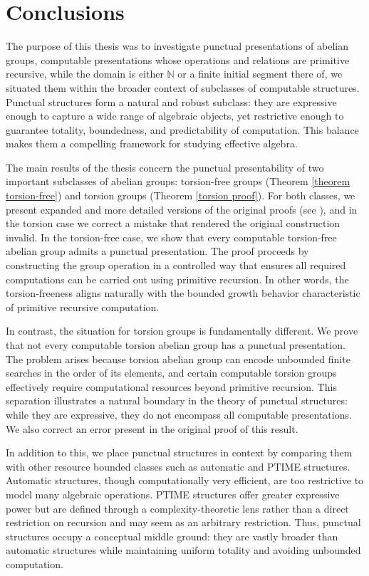 \documentclass{pracalicmgr2025}
\theoremstyle{plain}            %
\theoremstyle{remark}           %
\theoremstyle{definition}       %
\begin{document}
\chapter{Conclusions}
The purpose of this thesis was to investigate punctual presentations of abelian groups, computable presentations whose operations and relations are primitive recursive, while the domain is either $\mathbb{N}$ or a finite initial segment there of, we situated them within the broader context of subclasses of computable structures. Punctual structures form a natural and robust subclass: they are expressive enough to capture a wide range of algebraic objects, yet restrictive enough to guarantee totality, boundedness, and predictability of computation. This balance makes them a compelling framework for studying effective algebra.


The main results of the thesis concern the punctual presentability of two important subclasses of abelian groups: torsion-free groups (Theorem \ref{theorem torsion-free}) and torsion groups (Theorem \ref{torsion proof}). For both classes, we present expanded and more detailed versions of the original proofs (see \cite{3}), and in the torsion case we correct a mistake that rendered the original construction invalid. In the torsion-free case, we show that every computable torsion-free abelian group admits a punctual presentation. The proof proceeds by constructing the group operation in a controlled way that ensures all required computations can be carried out using primitive recursion. In other words, the torsion-freeness aligns naturally with the bounded growth behavior characteristic of primitive recursive computation.


In contrast, the situation for torsion groups is fundamentally different. We prove that not every computable torsion abelian group has a punctual presentation. The problem arises because torsion abelian group can encode unbounded finite searches in the order of its elements, and certain computable torsion groups effectively require computational resources beyond primitive recursion. This separation illustrates a natural boundary in the theory of punctual structures: while they are expressive, they do not encompass all computable presentations. We also correct an error present in the original proof of this result.


In addition to this, we place punctual structures in context by comparing them with other resource bounded classes such as automatic and PTIME structures. Automatic structures, though computationally very efficient, are too restrictive to model many algebraic operations. PTIME structures offer greater expressive power but are defined through a complexity-theoretic lens rather than a direct restriction on recursion and may seem as an arbitrary restriction. Thus, punctual structures occupy a conceptual middle ground: they are vastly broader than automatic structures while maintaining uniform totality and avoiding unbounded computation.
\end{document}
